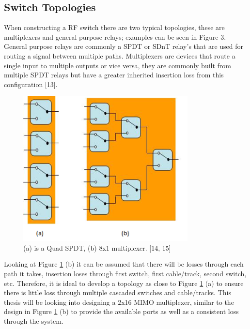 \documentclass[12pt,openany,a4paper]{book}
\begin{document}
\subsection{Switch Topologies}
When constructing a RF switch there are two typical topologies, these are multiplexers and general purpose relays; examples can be seen in Figure 3. General purpose relays are commonly a SPDT or SDnT relay's that are used for routing a signal between multiple paths. Multiplexers are devices that route a single input to multiple outputs or vice versa, they are commonly built from multiple SPDT relays but have a greater inherited insertion loss from this configuration [13].
\begin{figure}[H]
	\centering
    \includegraphics[width=0.8\textwidth]{topology.png}
	\caption{(a) is a Quad SPDT, (b) 8x1 multiplexer. [14, 15]}
	\label{fig:topology}
\end{figure} 
Looking at Figure \ref{fig:topology} (b) it can be assumed that there will be losses through each path it takes, insertion loses through first switch, first cable/track, second switch, etc. Therefore, it is ideal to develop a topology as close to Figure \ref{fig:topology} (a) to ensure there is little loss through multiple cascaded switches and cable/tracks. This thesis will be looking into designing a 2x16 MIMO multiplexer, similar to the design in Figure \ref{fig:topology} (b) to provide the available ports as well as a consistent loss through the system.

\end{document}
